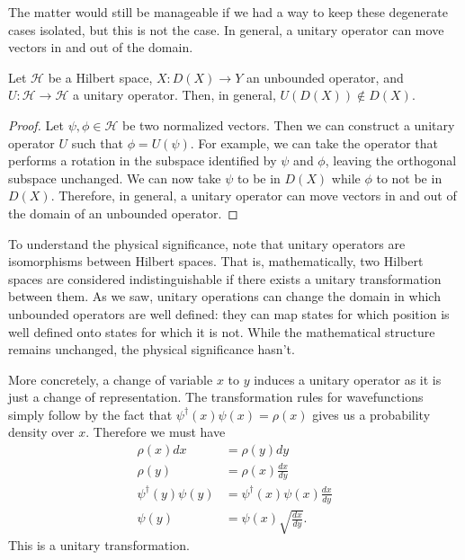 \documentclass[10pt,twocolumn, nofootinbib]{revtex4-2}
\begin{document}
The matter would still be manageable if we had a way to keep these degenerate cases isolated, but this is not the case. In general, a unitary operator can move vectors in and out of the domain.
\begin{prop}
Let $\mathcal{H}$ be a Hilbert space, $X : D(X) \to Y$ an unbounded operator, and $U : \mathcal{H} \to \mathcal{H}$ a unitary operator. Then, in general, $U(D(X)) \notin D(X)$.
\end{prop}
\begin{proof}
Let $\psi, \phi \in \mathcal{H}$ be two normalized vectors. Then we can construct a unitary operator $U$ such that $\phi = U(\psi)$. For example, we can take the operator that performs a rotation in the subspace identified by $\psi$ and $\phi$, leaving the orthogonal subspace unchanged. We can now take $\psi$ to be in $D(X)$ while $\phi$ to not be in $D(X)$. Therefore, in general, a unitary operator can move vectors in and out of the domain of an unbounded operator.
\end{proof}

To understand the physical significance, note that unitary operators are isomorphisms between Hilbert spaces. That is, mathematically, two Hilbert spaces are considered indistinguishable if there exists a unitary transformation between them. As we saw, unitary operations can change the domain in which unbounded operators are well defined: they can map states for which position is well defined onto states for which it is not. While the mathematical structure remains unchanged, the physical significance hasn't.

More concretely, a change of variable $x$ to $y$ induces a unitary operator as it is just a change of representation. The transformation rules for wavefunctions simply follow by the fact that $\psi^\dagger(x) \psi(x) = \rho(x)$ gives us a probability density over $x$. Therefore we must have
\begin{equation}
	\begin{aligned}
		\rho(x) dx &= \rho(y) dy \\
		\rho(y) &= \rho(x) \frac{dx}{dy} \\
		\psi^\dagger(y) \psi(y) &= \psi^\dagger(x) \psi(x) \frac{dx}{dy} \\
		\psi(y) &= \psi(x) \sqrt{\frac{dx}{dy}}.
	\end{aligned}
\end{equation}
This is a unitary transformation.
\end{document}
